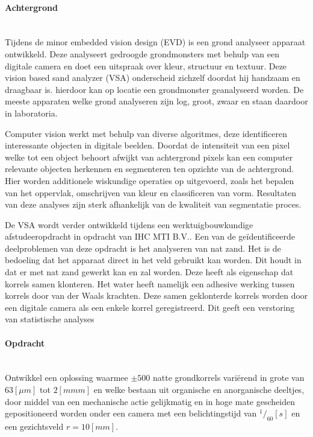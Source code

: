 \documentclass[a4paper,11pt]{../LatexDocStructures/MTItexMemo} %
\begin{document}
\maketitle %

\paragraph{Achtergrond}\mbox{} \\
Tijdens de minor embedded vision design (EVD) is een grond analyseer apparaat ontwikkeld. Deze analyseert gedroogde grondmonsters met behulp van een digitale camera en doet een uitspraak over kleur, structuur en textuur. Deze vision based sand analyzer (VSA) onderscheid zichzelf doordat hij handzaam en draagbaar is. hierdoor kan op locatie een grondmonster geanalyseerd worden. De meeste apparaten welke grond analyseren zijn log, groot, zwaar en staan daardoor in laboratoria.

Computer vision werkt met behulp van diverse algoritmes, deze identificeren interessante objecten in digitale beelden. Doordat de intensiteit van een pixel welke tot een object behoort afwijkt van achtergrond pixels kan een computer relevante objecten herkennen en segmenteren ten opzichte van de achtergrond. Hier worden additionele wiskundige operaties op uitgevoerd, zoals het bepalen van het oppervlak, omschrijven van kleur en classificeren van vorm. Resultaten van deze analyses zijn sterk afhankelijk van de kwaliteit van segmentatie proces.

De VSA wordt verder ontwikkeld tijdens een werktuigbouwkundige afstudeeropdracht in opdracht van IHC MTI B.V.. Een van de ge\"identificeerde deelproblemen van deze opdracht is het analyseren van nat zand. Het is de bedoeling dat het apparaat direct in het veld gebruikt kan worden. Dit houdt in dat er met nat zand gewerkt kan en zal worden. Deze heeft als eigenschap dat korrels samen klonteren. Het water heeft namelijk een adhesive werking tussen korrels door van der Waals krachten. Deze samen geklonterde korrels worden door een digitale camera als een enkele korrel geregistreerd. Dit geeft een verstoring van statistische analyses

\paragraph{Opdracht}\mbox{} \\
Ontwikkel een oplossing waarmee $ \pm 500 $ natte grondkorrels vari\"erend in grote van $ 63 [\mu m] $ tot $ 2 [mmm] $ en welke bestaan uit organische en anorganische deeltjes, door middel van een mechanische actie gelijkmatig en in hoge mate gescheiden gepositioneerd worden onder een camera met een belichtingstijd van $ ^1/_{60} [s] $ en een gezichtsveld $ r = 10[mm] $.
\end{document}

